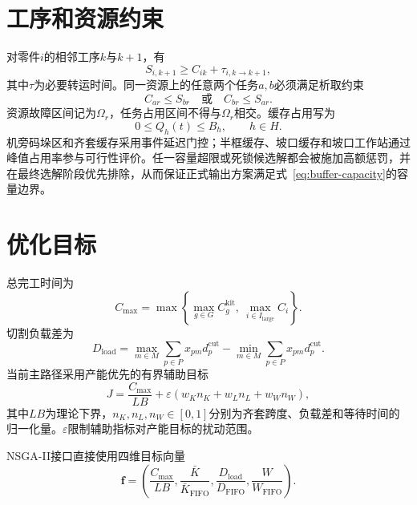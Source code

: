 \documentclass[UTF8,zihao=-4,openany]{ctexrep}
\begin{document}
\section{工序和资源约束}

对零件$i$的相邻工序$k$与$k+1$，有
\begin{equation}
 S_{i,k+1}\ge C_{ik}+\tau_{i,k\rightarrow k+1},
\end{equation}
其中$\tau$为必要转运时间。同一资源上的任意两个任务$a,b$必须满足析取约束
\begin{equation}
 C_{ar}\le S_{br}\quad\text{或}\quad C_{br}\le S_{ar}.
\end{equation}
资源故障区间记为$\Omega_r$，任务占用区间不得与$\Omega_r$相交。缓存占用写为
\begin{equation}
 0\le Q_h(t)\le B_h,\qquad h\in H.\label{eq:buffer-capacity}
\end{equation}
机旁码垛区和齐套缓存采用事件延迟门控；半框缓存、坡口缓存和坡口工作站通过峰值占用率参与可行性评价。任一容量超限或死锁候选解都会被施加高额惩罚，并在最终选解阶段优先排除，从而保证正式输出方案满足式~\eqref{eq:buffer-capacity}的容量边界。

\section{优化目标}

总完工时间为
\begin{equation}
 C_{\max}=\max\left\{\max_{g\in G}C_g^{\mathrm{kit}},\ \max_{i\in I_{\mathrm{large}}}C_i\right\}.
\end{equation}
切割负载差为
\begin{equation}
 D_{\mathrm{load}}=\max_{m\in M}\sum_{p\in P}x_{pm}d_p^{\mathrm{cut}}
 -\min_{m\in M}\sum_{p\in P}x_{pm}d_p^{\mathrm{cut}}.
\end{equation}
当前主路径采用产能优先的有界辅助目标
\begin{equation}
 J=\frac{C_{\max}}{LB}+\varepsilon
 \left(w_K n_K+w_L n_L+w_W n_W\right),
\end{equation}
其中$LB$为理论下界，$n_K,n_L,n_W\in[0,1]$分别为齐套跨度、负载差和等待时间的归一化量。$\varepsilon$限制辅助指标对产能目标的扰动范围。

NSGA-II接口直接使用四维目标向量
\begin{equation}
 \bm f=\left(\frac{C_{\max}}{LB},\frac{\bar K}{\bar K_{\mathrm{FIFO}}},
 \frac{D_{\mathrm{load}}}{D_{\mathrm{FIFO}}},\frac{W}{W_{\mathrm{FIFO}}}\right).
\end{equation}
\end{document}
